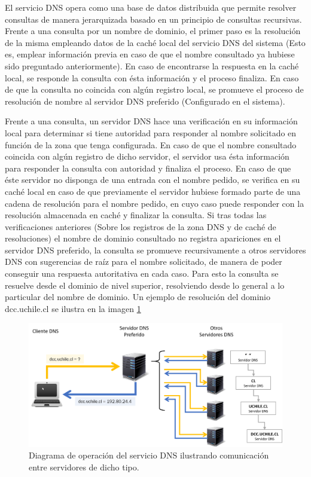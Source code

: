 \begin{intro}
El servicio DNS \cite{rfc:1034, rfc:1035} opera como una base de datos distribuida que permite resolver consultas de manera jerarquizada basado en un principio de consultas recursivas. Frente a una consulta por un nombre de dominio, el primer paso es la resolución de la misma empleando datos de la caché local del servicio DNS del sistema (Esto es, emplear información previa en caso de que el nombre consultado ya hubiese sido preguntado anteriormente). En caso de encontrarse la respuesta en la caché local, se responde la consulta con ésta información y el proceso finaliza. En caso de que la consulta no coincida con algún registro local, se promueve el proceso de resolución de nombre al servidor DNS preferido (Configurado en el sistema).  

Frente a una consulta, un servidor DNS hace una verificación en su información local para determinar si tiene autoridad para responder al nombre solicitado en función de la zona que tenga configurada. En caso de que el nombre consultado coincida con algún registro de dicho servidor, el servidor usa ésta información para responder la consulta con autoridad y finaliza el proceso. En caso de que éste servidor no disponga de una entrada con el nombre pedido, se verifica en su caché local en caso de que previamente el servidor hubiese formado parte de una cadena de resolución para el nombre pedido, en cuyo caso puede responder con la resolución almacenada en caché y finalizar la consulta. Si tras todas las verificaciones anteriores (Sobre los registros de la zona DNS y de caché de resoluciones) el nombre de dominio consultado no registra apariciones en el servidor DNS preferido, la consulta se promueve recursivamente a otros servidores DNS con sugerencias de raíz para el nombre solicitado, de manera de poder conseguir una respuesta autoritativa en cada caso. Para esto la consulta se resuelve desde el dominio de nivel superior, resolviendo desde lo general a lo particular del nombre de dominio. Un ejemplo de resolución del dominio dcc.uchile.cl se ilustra en la imagen \ref{fig:dns}

\begin{figure}[!h]
	\centering
	\includegraphics[scale=0.75]{imagenes/dns-system.png}
	\caption{Diagrama de operación del servicio DNS ilustrando comunicación entre servidores de dicho tipo.}
	\label{fig:dns}
\end{figure}


\end{intro}
